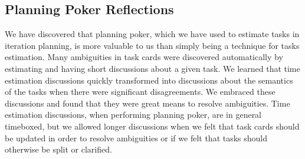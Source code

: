 
\subsection{Planning Poker Reflections}
We have discovered that planning poker, which we have used to estimate tasks in iteration planning, is more valuable to us than simply being a technique for tasks estimation. Many ambiguities in task cards were discovered automatically by estimating and having short discussions about a given task. We learned that time estimation discussions quickly transformed into discussions about the semantics of the tasks when there were significant disagreements. We embraced these discussions and found that they were great means to resolve ambiguities. Time estimation discussions, when performing planning poker, are in general timeboxed, but we allowed longer discussions when we felt that task cards should be updated in order to resolve ambiguities or if we felt that tasks should otherwise be split or clarified.
